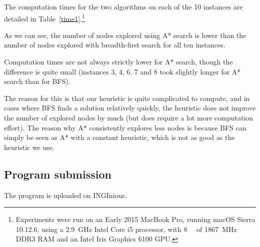 \documentclass[journal]{IEEEtran}
\begin{document}
 The computation times for the two algorithms on each of the 10 instances are detailed in Table~\ref{time1}.\footnote{Experiments were run on an Early 2015 MacBook Pro, running macOS Sierra 10.12.6, using a \SI{2.9}{\giga\hertz} Intel Core i5 processor, with \SI{8}{\giga\byte} of \SI{1867}{\mega\hertz} DDR3 RAM and an Intel Iris Graphics 6100 GPU.} 

As we can see, the number of nodes explored using A* search is lower than the number of nodes explored with breadth-first search for all ten instances.

Computation times are not always strictly lower for A* search, though the difference is quite small (instances 3, 4, 6, 7 and 8 took slightly longer for A* search than for BFS).

The reason for this is that our heuristic is quite complicated to compute, and in cases where BFS finds a solution relatively quickly, the heuristic does not improve the number of explored nodes by much (but does require a lot more computation effort).
The reason why A* consistently explores less nodes is because BFS can simply be seen as A* with a constant heuristic, which is not as good as the heuristic we use.

\subsection{Program submission}
The program is uploaded on INGInious.
\end{document}
